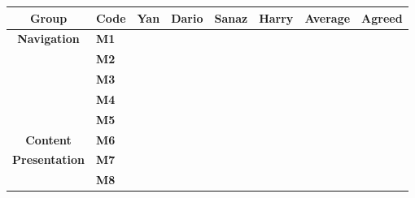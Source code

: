 \begin{table}[htp!]
    \centering
    \begin{tabular}{ |c|l|c|c|c|c|c|c| }
        \hline
        \textbf{Group} & \textbf{Code} & \textbf{Yan} & \textbf{Dario} & \textbf{Sanaz} & \textbf{Harry} & \textbf{Average} & \textbf{Agreed}\\
        \hline
        \multirow{5}{*}{\textbf{Navigation}} & \textbf{M1} & \textbf{\color{unicefGreen}{4}} & \textbf{\color{unicefRed}{2}} & \textbf{\color{unicefGreen}{4}} & \textbf{\color{unicefGreen}{4}} & \textbf{\color{unicefOrange}{3.5}} & \textbf{\color{unicefOrange}{3}}\\
        \cline{2-8}
        & \textbf{M2} & \textbf{\color{unicefGreen}{4}} & \textbf{\color{unicefGreen}{4}} & \textbf{\color{unicefGreen}{4.5}} & \textbf{\color{unicefRed}{2}} & \textbf{\color{unicefOrange}{3.625}} & \textbf{\color{unicefGreen}{4}}\\
        \cline{2-8}
        & \textbf{M3} & \textbf{\color{unicefGreen}{4}} & \textbf{\color{unicefGreen}{5}} & \textbf{\color{unicefGreen}{5}} & \textbf{\color{unicefRed}{2}} & \textbf{\color{unicefGreen}{4}} & \textbf{\color{unicefGreen}{4}}\\
        \cline{2-8}
        & \textbf{M4} & \textbf{\color{unicefGreen}{5}} & \textbf{\color{unicefOrange}{3}} & \textbf{\color{unicefGreen}{5}} & \textbf{\color{unicefRed}{1}} & \textbf{\color{unicefOrange}{3.5}} & \textbf{\color{unicefOrange}{3}}\\
        \cline{2-8}
        & \textbf{M5} & \textbf{\color{unicefGreen}{4}} & \textbf{\color{unicefGreen}{4}} & \textbf{\color{unicefGreen}{4}} & \textbf{\color{unicefOrange}{3}} & \textbf{\color{unicefOrange}{3.75}} & \textbf{\color{unicefGreen}{4}}\\
        \cline{2-8}
        \hline
        \textbf{Content} & \textbf{M6} & \textbf{\color{unicefGreen}{4}} & \textbf{\color{unicefOrange}{3}} & \textbf{\color{unicefGreen}{4.5}} & \textbf{\color{unicefOrange}{3}} & \textbf{\color{unicefOrange}{3.625}} & \textbf{\color{unicefGreen}{4}}\\
        \hline
        \multirow{6}{*}{\textbf{Presentation}} & \textbf{M7} & \textbf{\color{unicefGreen}{5}} & \textbf{\color{unicefGreen}{5}} & \textbf{\color{unicefGreen}{4}} & \textbf{\color{unicefGreen}{5}} & \textbf{\color{unicefGreen}{4.75}} & \textbf{\color{unicefGreen}{5}}\\
        \cline{2-8}
        & \textbf{M8} & \textbf{\color{unicefGreen}{4}} & \textbf{\color{unicefGreen}{4}} & \textbf{\color{unicefGreen}{5}} & \textbf{\color{unicefGreen}{5}} & \textbf{\color{unicefGreen}{4.5}} & \textbf{\color{unicefGreen}{4.5}}\\

\end{tabular}
\end{table}
